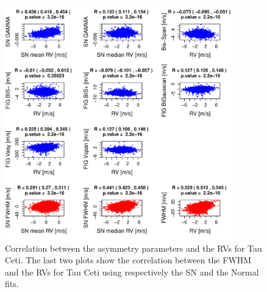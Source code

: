 \documentclass[11pt, oneside]{article}
\begin{document}
%
\begin{figure}[htbp]
   \centering
\includegraphics[height = 4in]{HD10700_[4]Comparison_para.pdf}  
   \caption{Correlation between the asymmetry parameters and the RVs for Tau Ceti. The last two plots show the correlation between the FWHM and the RVs for Tau Ceti using respectively the SN and the Normal fits.}
   \label{fig:Tau:corrPlot}
\end{figure}
\end{document}
